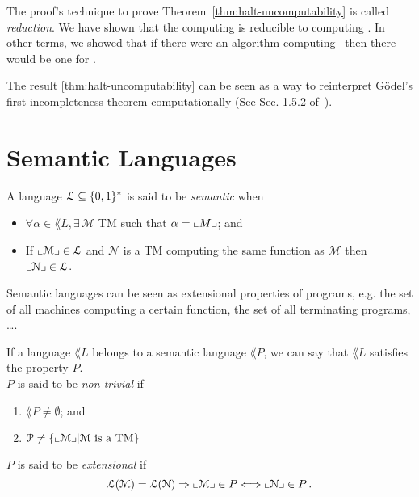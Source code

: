 \begin{remark}
	The proof's technique to prove Theorem~\ref{thm:halt-uncomputability} is called \emph{reduction}. We have shown that the computing \UC is reducible to computing \HALT. In other terms, we showed that if there were an algorithm computing \HALT~then there would be one for \UC.
	\label{rmk:reduction}
\end{remark}
\begin{remark}
	The result \ref{thm:halt-uncomputability} can be seen as a way to reinterpret Gödel's first incompleteness theorem computationally (See Sec. 1.5.2 of~\citet{Arora2009}).
\end{remark}

\section{Semantic Languages}\label{sec:semantic-languages}

\begin{definition}
	A language $\mathcal{L} \subseteq \{ 0,1 \}^* $ is said to be \emph{semantic} when
	\begin{itemize}
		\item $\forall \alpha \in \lang{L}, \exists \, \mathcal{M}$ TM such that $\alpha = \llcorner M \lrcorner$; and
		\item If $\llcorner \mathcal{M} \lrcorner \in \mathcal{L}$ and $\mathcal{N}$ is a TM computing the same function as $\mathcal{M}$ then $\llcorner \mathcal{N} \lrcorner \in \mathcal{L}$.
		      \label{def:semantic-language}
	\end{itemize}
\end{definition}
\begin{remark}
	Semantic languages can be seen as extensional properties of programs, e.g. the set of all machines computing a certain function, the set of all terminating programs, \ldots.

\end{remark}

\begin{definition}[Property]
	If a language \(\lang{L}\) belongs to a semantic language \(\lang{P}\), we can say that \(\lang{L}\) satisfies the property \( P\). \\
	$P$ is said to be \emph{non-trivial} if
	\begin{enumerate}
		\item \(\lang{P} \neq \emptyset\); and
		\item \(\mathcal{P} \neq \{  \llcorner \mathcal{M} \lrcorner  | \mathcal{M} \text{ is a TM} \} \)
	\end{enumerate}
	$P$ is said to be \emph{extensional} if
	\[
		\mathcal{L}(\mathcal{M}) = \mathcal{L}(\mathcal{N}) \Rightarrow \llcorner \mathcal{M} \lrcorner \in P \Longleftrightarrow \llcorner \mathcal{N} \lrcorner \in P \, .
	\]
\end{definition}

